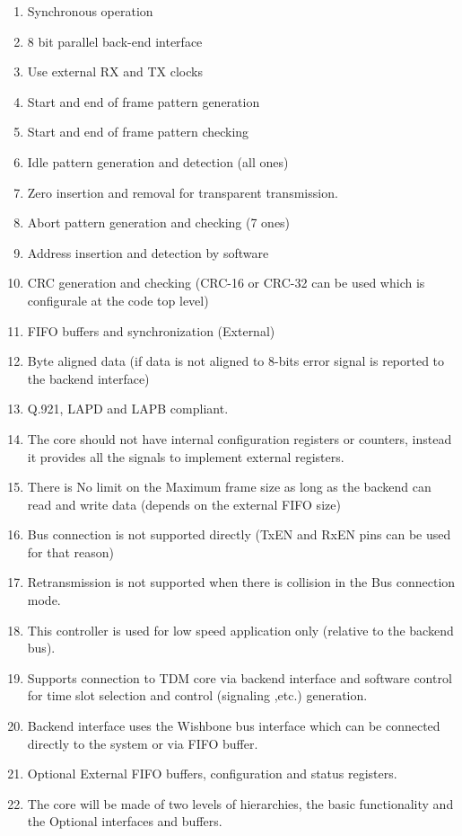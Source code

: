 \documentclass[a4paper,11pt]{article}
\begin{document}
\begin{enumerate}
\item  Synchronous operation
\item  8 bit parallel back-end interface
\item  Use external RX and TX clocks
\item  Start and end of frame pattern generation
\item  Start and end of frame pattern checking
\item  Idle pattern generation and detection (all ones)
\item  Zero insertion and removal for transparent transmission.
\item  Abort pattern generation and checking (7 ones)
\item  Address insertion and detection by software
\item  CRC generation and checking (CRC-16 or CRC-32 can be used which is configurale at the code top level)
\item  FIFO buffers and synchronization (External)
\item  Byte aligned data (if data is not aligned to 8-bits error signal is reported to the backend interface)
\item  Q.921, LAPD and LAPB compliant.
\item  The core should not have internal configuration registers or counters, instead it provides all the signals to implement external registers.
\item  There is No limit on the Maximum frame size as long as the backend can read and write data (depends on the external FIFO size)
\item  Bus connection is not supported directly (TxEN and RxEN pins can be used for that reason)
\item  Retransmission is not supported when there is collision in the Bus connection mode.
\item This controller is used for low speed application only (relative to the backend bus).
\item Supports connection to TDM core via backend interface and software control for time slot selection and control (signaling ,etc.) generation.
\item Backend interface uses the Wishbone bus interface which can be connected directly to the system or via FIFO buffer.
\item Optional External FIFO buffers, configuration and status registers.
\item The core will be made of two levels of hierarchies, the basic functionality and the Optional interfaces and buffers.
\end{enumerate}
\end{document}
